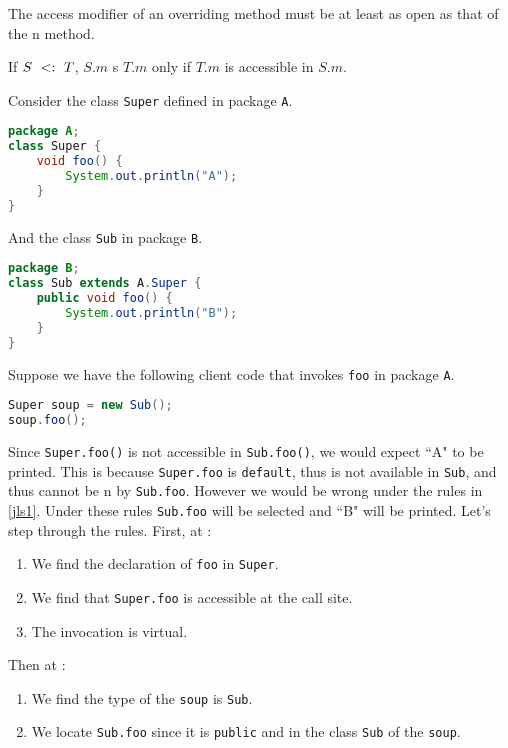 \documentclass{article}
\begin{document}
\begin{definition}
The access modifier of an overriding method must be at least as open as that of the \override{}n method.
\end{definition}

\begin{definition}
If $S ~ <: ~ T$, $S.m$ \override{}s $T.m$ only if $T.m$ is accessible in $S.m$.
\end{definition}

\begin{example}
Consider the class \texttt{Super} defined in package \texttt{A}.
\begin{lstlisting}[language=Java]
package A;
class Super {
    void foo() {
        System.out.println("A");
    }
}
\end{lstlisting}
And the class \texttt{Sub} in package \texttt{B}.
\begin{lstlisting}[language=Java]
package B;
class Sub extends A.Super {
    public void foo() {
        System.out.println("B");
    }
}
\end{lstlisting}
Suppose we have the following client code that invokes \texttt{foo} in package \texttt{A}.
\begin{lstlisting}[language = Java]
Super soup = new Sub();
soup.foo();
\end{lstlisting}
Since \texttt{Super.foo()} is not accessible in \texttt{Sub.foo()}, we would expect ``A" to be printed.
This is because \texttt{Super.foo} is \texttt{default}, thus is not available in \texttt{Sub}, and thus cannot be \override{}n by \texttt{Sub.foo}.
However we would be wrong under the rules in \ref{jls1}.
Under these rules \texttt{Sub.foo} will be selected and ``B" will be printed.
Let's step through the rules.
First, at \compiletime{}:
\begin{enumerate}
\item We find the \static{} declaration of \texttt{foo} in \texttt{Super}.
\item We find that \texttt{Super.foo} is accessible at the call site.
\item The invocation is virtual.
\end{enumerate}
Then at \runtime{}:
\begin{enumerate}
\item We find the \dynamic{} type of the \receiver{} \texttt{soup} is \texttt{Sub}.
\item We locate \texttt{Sub.foo} since it is \texttt{public} and in the class \texttt{Sub} of the \receiver{} \texttt{soup}.
\end{enumerate}
\end{example}
\end{document}
